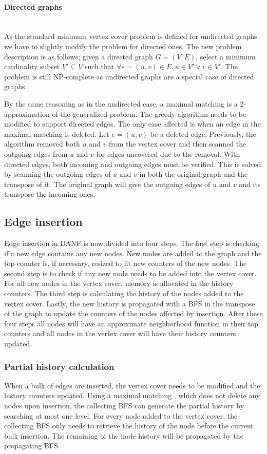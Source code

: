 \paragraph{Directed graphs} \mbox{} \\
As the standard minimum vertex cover problem is defined for undirected graphs we have to slightly modify the problem  for directed ones. The new problem description is as follows; given a directed graph $G = (V,E)$, select a minimum cardinality subset $V' \subseteq V$ such that $\forall e = (u,v) \in E, u \in V' \vee v \in V'$. The problem is still NP-complete as undirected graphs are a special case of directed graphs. 

By the same reasoning as in the undirected case, a maximal matching is a $2$-approximation of the generalized problem. The greedy algorithm needs to be modified to support directed edges. The only case affected is when an edge in the maximal matching is deleted. Let $e = (u,v)$ be a deleted edge. Previously, the algorithm removed both $u$ and $v$ from the vertex cover and then scanned the outgoing edges from $u$ and $v$ for edges uncovered due to the removal. With directed edges, both incoming and outgoing edges must be verified. This is solved by scanning the outgoing edges of $u$ and $v$ in both the original graph and the transpose of it. The original graph will give the outgoing edges of $u$ and $v$ and its transpose the incoming ones.


\subsection{Edge insertion}

Edge insertion in DANF is now divided into four steps. The first step is checking if a new edge contains any new nodes. New nodes are added to the graph and the top counter is, if necessary, resized to fit new counters of the new nodes. The second step is to check if any new node needs to be added into the vertex cover. For all new nodes in the vertex cover, memory is allocated in the history counters. The third step is calculating the history of the nodes added to the vertex cover. Lastly, the new history is propagated with a BFS in the transpose of the graph to update the counters of the nodes affected by insertion. After these four steps all nodes will have an approximate neighborhood function in their top counters and all nodes in the vertex cover will have their history counters updated. 

\subsubsection{Partial history calculation}
When a bulk of edges are inserted, the vertex cover needs to be modified and the history counters updated. Using a maximal matching \cite{2appdynvc}, which does not delete any nodes upon insertion, the collecting BFS can generate the partial history by searching at most one level. For every node added to the vertex cover, the collecting BFS only needs to retrieve the history of the node before the current bulk insertion. The remaining of the node history will be propagated by the propagating BFS.

